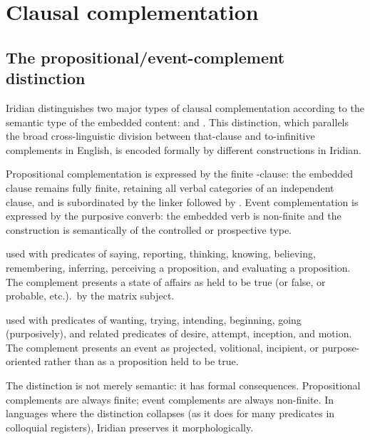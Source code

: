 \section{Clausal complementation}\label{sec:complementation}

\subsection{The propositional/event-complement distinction}
\label{sec:th-compl-distinction}

Iridian distinguishes two major types of clausal complementation according to
the semantic type of the embedded content: 
and . This distinction, which parallels the
broad cross-linguistic division between that-clause and to-infinitive
complements in English, is encoded formally by different constructions in
Iridian.

Propositional complementation is expressed by the finite -clause:
the embedded clause remains fully finite, retaining all verbal categories
of an independent clause, and is subordinated by the linker 
followed by . Event complementation is expressed by the purposive
converb: the embedded verb is non-finite and the construction is semantically
of the controlled or prospective type.

\begin{description}[leftmargin=2em, labelwidth=!, labelindent=0em]
\item[\upshape Propositional complement (\ird{po}):] used with predicates of
	saying, reporting, thinking, knowing, believing, remembering, inferring,
	perceiving a proposition, and evaluating a proposition. The complement
	presents a state of affairs as held to be true (or false, or probable,
	etc.).\ by the matrix subject.
\item[\upshape Event complement (purposive converb):] used with predicates of
	wanting, trying, intending, beginning, going (purposively), and related
	predicates of desire, attempt, inception, and motion. The complement
	presents an event as projected, volitional, incipient, or
	purpose-oriented rather than as a proposition held to be true.
\end{description}

\noindent The distinction is not merely semantic: it has formal consequences.
Propositional complements are always finite; event complements are always
non-finite. In languages where the distinction collapses (as it does for many
predicates in colloquial registers), Iridian preserves it morphologically.

